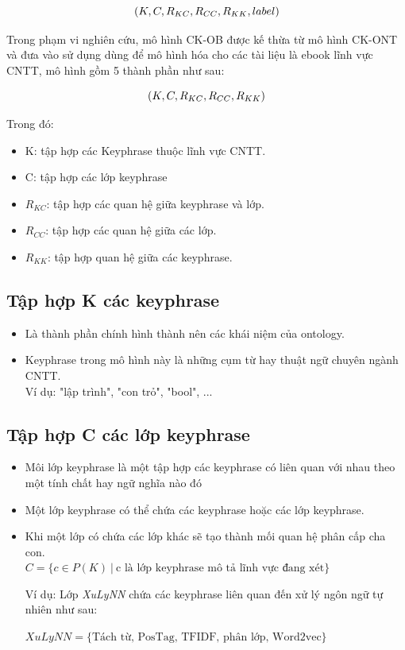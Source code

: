 \begin{equation}
    \centering
    (K, C, R_{KC}, R_{CC}, R_{KK}, label)
\end{equation}

Trong phạm vi nghiên cứu, mô hình CK-OB được kế thừa từ mô hình CK-ONT và đưa vào sử dụng dùng để mô hình hóa cho các tài liệu là ebook lĩnh vực CNTT, mô hình gồm 5 thành phần như sau: 

\begin{equation}
    \centering
    (K, C, R_{KC}, R_{CC}, R_{KK})
\end{equation}

Trong đó:
\begin{itemize}
    \item K: tập hợp các Keyphrase thuộc lĩnh vực CNTT.
    \item C: tập hợp các lớp keyphrase
    \item $R_{KC}$: tập hợp các quan hệ giữa keyphrase và lớp.
    \item $R_{CC}$: tập hợp các quan hệ giữa các lớp.
    \item $R_{KK}$: tập hợp quan hệ giữa các keyphrase.
\end{itemize}

\subsection{Tập hợp K các keyphrase}

\begin{itemize}
    \item Là thành phần chính hình thành nên các khái niệm của ontology.
    \item Keyphrase trong mô hình này là những cụm từ hay thuật ngữ chuyên ngành CNTT. \\
    Ví dụ: "lập trình", "con trỏ", "bool", ...
\end{itemize}

\subsection{Tập hợp C các lớp keyphrase}

\begin{itemize}
    \item Môi lớp keyphrase là một tập hợp các keyphrase có liên quan với nhau theo một tính chất hay ngữ nghĩa nào đó
    \item Một lớp keyphrase có thể chứa các keyphrase hoặc các lớp keyphrase.
    \item Khi một lớp có chứa các lớp khác sẽ tạo thành mối quan hệ phân cấp cha con. \\

$C = \{ c \in P(K)\ |\ \text{c là lớp keyphrase mô tả lĩnh vực đang xét} \}$

Ví dụ: Lớp \textit{XuLyNN} chứa các keyphrase liên quan đến xử lý ngôn ngữ tự nhiên như sau:

$XuLyNN = \{ \text{Tách từ, PosTag, TFIDF, phân lớp, Word2vec} \}$

\end{itemize}

